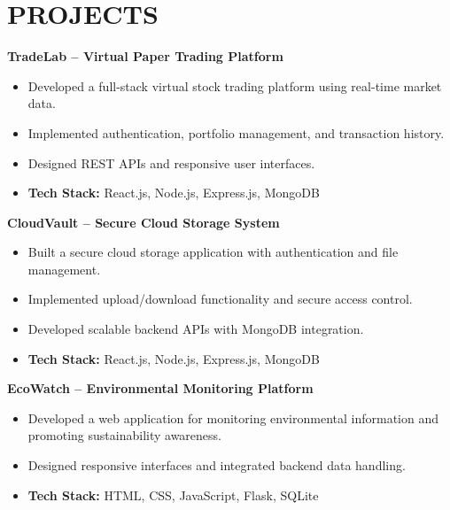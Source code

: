 \documentclass[10pt,letterpaper]{article}
\begin{document}
\section*{PROJECTS}

\noindent \textbf{TradeLab -- Virtual Paper Trading Platform}
\begin{itemize}[leftmargin=*, itemsep=3pt, topsep=2pt, parsep=0pt, label=\textbullet]
    \item Developed a full-stack virtual stock trading platform using real-time market data.
    \item Implemented authentication, portfolio management, and transaction history.
    \item Designed REST APIs and responsive user interfaces.
    \item \textbf{Tech Stack:} React.js, Node.js, Express.js, MongoDB
\end{itemize}

\vspace{8pt}

\noindent \textbf{CloudVault -- Secure Cloud Storage System}
\begin{itemize}[leftmargin=*, itemsep=3pt, topsep=2pt, parsep=0pt, label=\textbullet]
    \item Built a secure cloud storage application with authentication and file management.
    \item Implemented upload/download functionality and secure access control.
    \item Developed scalable backend APIs with MongoDB integration.
    \item \textbf{Tech Stack:} React.js, Node.js, Express.js, MongoDB
\end{itemize}

\vspace{8pt}

\noindent \textbf{EcoWatch -- Environmental Monitoring Platform}
\begin{itemize}[leftmargin=*, itemsep=3pt, topsep=2pt, parsep=0pt, label=\textbullet]
    \item Developed a web application for monitoring environmental information and promoting sustainability awareness.
    \item Designed responsive interfaces and integrated backend data handling.
    \item \textbf{Tech Stack:} HTML, CSS, JavaScript, Flask, SQLite
\end{itemize}
\end{document}
